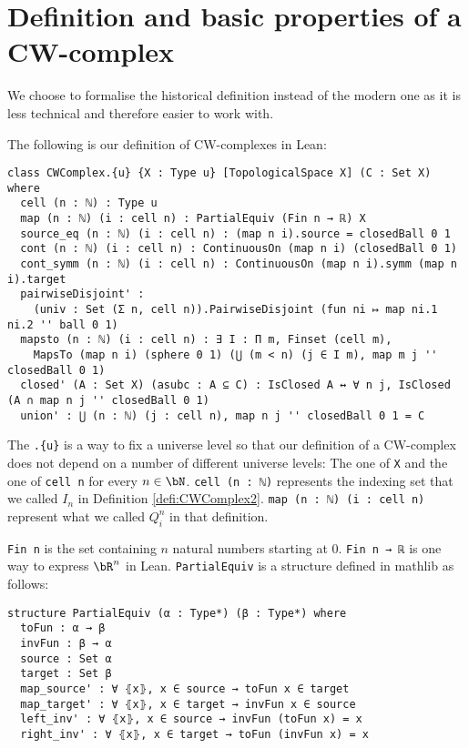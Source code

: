 \section{Definition and basic properties of a CW-complex}

We choose to formalise the historical definition instead of the modern one as it is less technical and therefore easier to work with.

The following is our definition of CW-complexes in Lean:

\begin{lstlisting}
class CWComplex.{u} {X : Type u} [TopologicalSpace X] (C : Set X) where
  cell (n : ℕ) : Type u
  map (n : ℕ) (i : cell n) : PartialEquiv (Fin n → ℝ) X
  source_eq (n : ℕ) (i : cell n) : (map n i).source = closedBall 0 1
  cont (n : ℕ) (i : cell n) : ContinuousOn (map n i) (closedBall 0 1)
  cont_symm (n : ℕ) (i : cell n) : ContinuousOn (map n i).symm (map n i).target
  pairwiseDisjoint' :
    (univ : Set (Σ n, cell n)).PairwiseDisjoint (fun ni ↦ map ni.1 ni.2 '' ball 0 1)
  mapsto (n : ℕ) (i : cell n) : ∃ I : Π m, Finset (cell m),
    MapsTo (map n i) (sphere 0 1) (⋃ (m < n) (j ∈ I m), map m j '' closedBall 0 1)
  closed' (A : Set X) (asubc : A ⊆ C) : IsClosed A ↔ ∀ n j, IsClosed (A ∩ map n j '' closedBall 0 1)
  union' : ⋃ (n : ℕ) (j : cell n), map n j '' closedBall 0 1 = C
\end{lstlisting}

The \lstinline|.{u}| is a way to fix a universe level so that our definition of a CW-complex does not depend on a number of different universe levels: The one of \lstinline{X} and the one of \lstinline{cell n} for every $n \in \bN$.
\lstinline{cell (n : ℕ)} represents the indexing set that we called $I_n$ in Definition \ref{defi:CWComplex2}. \lstinline{map (n : ℕ) (i : cell n)} represent what we called $Q_i^n$ in that definition.

\lstinline{Fin n} is the set containing $n$ natural numbers starting at 0.
\lstinline{Fin n → ℝ} is one way to express $\bR^n$ in Lean.
\lstinline{PartialEquiv} is a structure defined in mathlib as follows:

\begin{lstlisting}
structure PartialEquiv (α : Type*) (β : Type*) where
  toFun : α → β
  invFun : β → α
  source : Set α
  target : Set β
  map_source' : ∀ ⦃x⦄, x ∈ source → toFun x ∈ target
  map_target' : ∀ ⦃x⦄, x ∈ target → invFun x ∈ source
  left_inv' : ∀ ⦃x⦄, x ∈ source → invFun (toFun x) = x
  right_inv' : ∀ ⦃x⦄, x ∈ target → toFun (invFun x) = x
\end{lstlisting}

